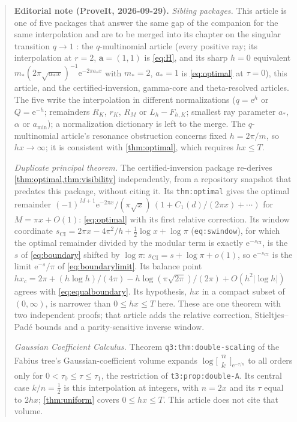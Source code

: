\documentclass[11pt,a4paper]{article}
\theoremstyle{definition}
\theoremstyle{remark}
\newcommand{\e}{\mathrm e}
\begin{document}
\begin{quote}\small
\textbf{Editorial note (ProveIt, 2026-09-29).}
\emph{Sibling packages.} This article is one of five packages that answer
the same gap of the companion for the same interpolation and are to be merged
into its chapter on the singular transition $q\to1$ \cite{ed:siblings}: the
$q$-multinomial article (every positive ray; its interpolation at $r=2$,
$\boldsymbol a=(1,1)$ is \eqref{eq:H}, and its sharp $h=0$ equivalent
$m_*(2\pi\sqrt{a_*x})^{-1}\e^{-2\pi a_*x}$ with $m_*=2$, $a_*=1$ is
\eqref{eq:optimal} at $\tau=0$), this article, and the certified-inversion,
gamma-core and theta-resolved articles. The five write the interpolation in different normalizations ($q=\e^h$ or $Q=\e^{-h}$; remainders $R_K$, $r_K$, $R_M$ or $L_h-F_{h,K}$; smallest ray parameter $a_*$, $\alpha$ or $a_{\min}$); a normalization dictionary is left to the merge.
The $q$-multinomial article's resonance obstruction concerns fixed
$h=2\pi/m$, so $hx\to\infty$; it is consistent with \cref{thm:optimal},
which requires $hx\le T$.

\emph{Duplicate principal theorem.} The certified-inversion package
re-derives \cref{thm:optimal,thm:visibility} independently, from a
repository snapshot that predates this package, without citing it. Its
\texttt{thm:optimal} gives the optimal remainder
$(-1)^{M+1}\e^{-2\pi x}/(\pi\sqrt x)\,(1+C_1(d)/(2\pi x)+\cdots)$ for
$M=\pi x+O(1)$: \eqref{eq:optimal} with its first relative correction. Its
window coordinate $s_{\mathrm{CI}}=2\pi x-4\pi^2/h+\frac12\log x+\log\pi$
(\texttt{eq:swindow}), for which the optimal remainder divided by the
modular term is exactly $\e^{-s_{\mathrm{CI}}}$, is the $s$ of
\eqref{eq:boundary} shifted by $\log\pi$: $s_{\mathrm{CI}}=s+\log\pi+o(1)$,
so $\e^{-s_{\mathrm{CI}}}$ is the limit $\e^{-s}/\pi$ of
\eqref{eq:boundarylimit}. Its balance point
$hx_c=2\pi+(h\log h)/(4\pi)-h\log(\pi\sqrt{2\pi})/(2\pi)+O(h^2|\log h|)$
agrees with \eqref{eq:equalboundary}. Its hypothesis, $hx$ in a compact
subset of $(0,\infty)$, is narrower than $0\le hx\le T$ here. These are one
theorem with two independent proofs; that article adds the relative
correction, Stieltjes--Pad\'e bounds and a parity-sensitive inverse window.

\emph{Gaussian Coefficient Calculus.} Theorem \texttt{q3:thm:double-scaling}
of the Fabius tree's Gaussian-coefficient volume \cite{ed:gcc} expands
$\log\bigl[\begin{smallmatrix}n\\k\end{smallmatrix}\bigr]_{\e^{-\tau/n}}$ to
all orders only for $0<\tau_0\le\tau\le\tau_1$, the restriction of
\texttt{t3:prop:double-A}. Its central case $k/n=\frac12$ is this
interpolation at integers, with $n=2x$ and its $\tau$ equal to $2hx$;
\cref{thm:uniform} covers $0\le hx\le T$. This article does not cite that
volume.


\end{quote}
\end{document}
